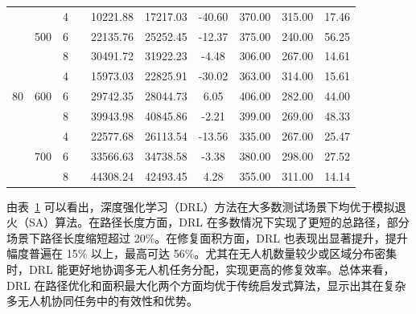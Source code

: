 \documentclass[AutoFakeBold]{LZUThesis}
\begin{document}
\begin{table}[H]
\begin{tabular}{cccc ccc ccc}
		\midrule
		\multirow{9}{*}{80} & \multirow{3}{*}{500} & 4    &  & 10221.88                 & 17217.03                 & -40.60  & 370.00 & 315.00 & 17.46   \\
		                    &                      & 6    &  & 22135.76                 & 25252.45                 & -12.37  & 375.00 & 240.00 & 56.25   \\
		                    &                      & 8    &  & 30491.72                 & 31922.23                 & -4.48   & 306.00 & 267.00 & 14.61   \\
		\cmidrule(lr){2-10}
		                    & \multirow{3}{*}{600} & 4    &  & 15973.03                 & 22825.91                 & -30.02  & 363.00 & 314.00 & 15.61   \\
		                    &                      & 6    &  & 29742.35                 & 28044.73                 & 6.05    & 406.00 & 282.00 & 44.00   \\
		                    &                      & 8    &  & 39943.98                 & 40845.86                 & -2.21   & 399.00 & 269.00 & 48.33   \\
		\cmidrule(lr){2-10}
		                    & \multirow{3}{*}{700} & 4    &  & 22577.68                 & 26113.54                 & -13.56  & 335.00 & 267.00 & 25.47   \\
		                    &                      & 6    &  & 33566.63                 & 34738.58                 & -3.38   & 380.00 & 298.00 & 27.52   \\
		                    &                      & 8    &  & 44308.24                 & 42493.45                 & 4.28    & 355.00 & 311.00 & 14.14   \\
		\bottomrule
	\end{tabular}
	\label{tab:combined_comparison}
\end{table}

由表~\ref{tab:combined_comparison} 可以看出，深度强化学习（DRL）方法在大多数测试场景下均优于模拟退火（SA）算法。在路径长度方面，DRL 在多数情况下实现了更短的总路径，部分场景下路径长度缩短超过 20\%。在修复面积方面，DRL 也表现出显著提升，提升幅度普遍在 15\% 以上，最高可达 56\%。尤其在无人机数量较少或区域分布密集时，DRL 能更好地协调多无人机任务分配，实现更高的修复效率。总体来看，DRL 在路径优化和面积最大化两个方面均优于传统启发式算法，显示出其在复杂多无人机协同任务中的有效性和优势。

\end{document}
